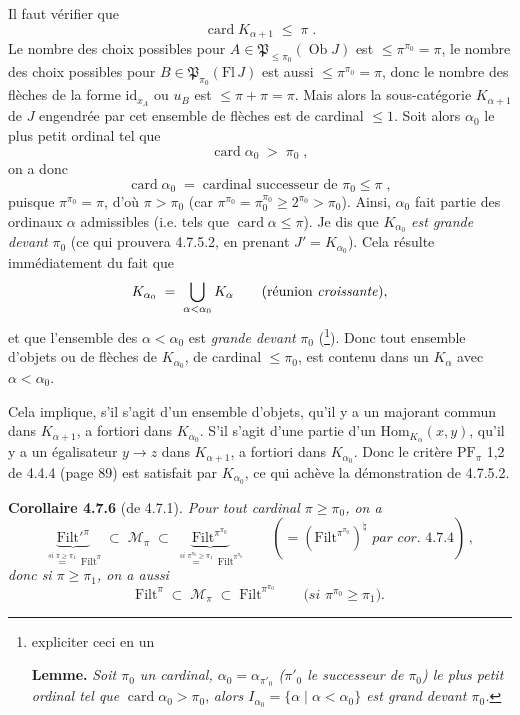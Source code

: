 \documentclass[11pt]{article}
\newcommand{\printedpage}[1]{\marginpar{\footnotesize p.~#1}}
\newcommand{\msp}[1]{\marginpar{\footnotesize [#1]}}
\newcommand{\Filt}{\mathrm{Filt}}
\newcommand{\card}{\operatorname{card}}
\newcommand{\Ob}{\operatorname{Ob}}
\begin{document}
Il faut vérifier que
\[
\card K_{\alpha+1} \;\leqslant\; \pi \;.
\]
Le nombre des choix possibles pour $A \in \mathfrak{P}_{\leqslant \pi_0}(\Ob J)$ \msp{page 170} est $\leqslant \pi^{\pi_0} = \pi$, le nombre des choix possibles pour $B \in \mathfrak{P}_{\pi_0}(\mathrm{Fl}\, J)$ est aussi $\leqslant \pi^{\pi_0} = \pi$, donc le nombre des flèches de la forme $\mathrm{id}_{x_A}$ ou $u_B$ est $\leqslant \pi + \pi = \pi$. Mais alors la sous-catégorie $K_{\alpha+1}$ de $J$ engendrée par cet ensemble de flèches est de cardinal $\leqslant 1$. Soit alors %
\printedpage{57}
$\alpha_0$ le plus petit ordinal tel que
\[
\card \alpha_0 \;>\; \pi_0 \;,
\]
on a donc
\[
\card \alpha_0 \;=\; \text{cardinal successeur de } \pi_0 \leqslant \pi \;,
\]
puisque $\pi^{\pi_0} = \pi$, d’où $\pi > \pi_0$ (car $\pi^{\pi_0} = \pi_0^{\pi_0} \geqslant 2^{\pi_0} > \pi_0$). Ainsi, $\alpha_0$ fait partie des ordinaux $\alpha$ admissibles (i.e. tels que $\card \alpha \leqslant \pi$). Je dis que $K_{\alpha_0}$ \textit{est grande devant} $\pi_0$ (ce qui prouvera 4.7.5.2, en prenant $J' = K_{\alpha_0}$). Cela résulte immédiatement du fait que
\[
K_{\alpha_0} \;=\; \bigcup_{\alpha < \alpha_0} K_{\alpha} \qquad (\text{réunion \textit{croissante}}),
\]
et que l’ensemble des $\alpha < \alpha_0$ est \textit{grande devant} $\pi_0$ (\footnote[71]{expliciter ceci en un

\textbf{Lemme.} \textit{Soit $\pi_0$ un cardinal, $\alpha_0 = \alpha_{\pi'_0}$ ($\pi'_0$ le successeur de $\pi_0$) le plus petit ordinal tel que} $\card \alpha_0 > \pi_0$, \textit{alors $I_{\alpha_0} = \{\alpha \mid \alpha < \alpha_0\}$ est grand devant $\pi_0$.}}). Donc tout ensemble d’objets ou de flèches de $K_{\alpha_0}$, de cardinal $\leqslant \pi_0$, est contenu dans un $K_{\alpha}$ avec $\alpha < \alpha_0$.

\msp{page 171}
Cela implique, s’il s’agit d’un ensemble d’objets, qu’il y a un majorant commun dans $K_{\alpha+1}$, a fortiori dans $K_{\alpha_0}$. S’il s’agit d’une partie d’un $\mathrm{Hom}_{K_{\alpha}}(x,y)$, qu’il y a un égalisateur $y \longrightarrow z$ dans $K_{\alpha+1}$, a fortiori dans $K_{\alpha_0}$. Donc le critère $\mathrm{PF}_{\pi}$ 1,2 de 4.4.4 (page 89) est satisfait par $K_{\alpha_0}$, ce qui achève la démonstration de 4.7.5.2.

\textbf{Corollaire 4.7.6} (de 4.7.1). \textit{Pour tout cardinal $\pi \geqslant \pi_0$, on a}
\[
\underbrace{\Filt'^{\pi}}_{\overset{\textit{si } \pi \geqslant \pi_1}{=}\ \Filt^{\pi}} \;\subset\; \mathcal{M}_{\pi} \;\subset\; \underbrace{\Filt^{\pi^{\pi_0}}}_{\overset{\textit{si } \pi^{\pi_0} \geqslant \pi_1}{=}\ \Filt^{\pi^{\pi_0}}} \qquad (= (\Filt^{\pi^{\pi_0}})^{\natural} \textit{ par cor. 4.7.4})\,, \tag*{(4.7.6.1)} %
\]
\textit{donc si $\pi \geqslant \pi_1$, on a aussi}
\[
\Filt^{\pi} \;\subset\; \mathcal{M}_{\pi} \;\subset\; \Filt^{\pi^{\pi_0}} \qquad \textit{(si $\pi^{\pi_0} \geqslant \pi_1$).} \tag*{(4.7.6.2)}
\]
\end{document}
